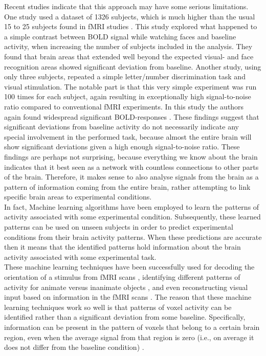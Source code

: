 \documentclass[preprint,journal]{vgtc}
\begin{document}
\indent Recent studies indicate that this approach may have some serious limitations. One study used a dataset of 1326 subjects, which is much higher than the usual 15 to 25 subjects found in fMRI studies \cite{thy:2012very}. This study explored what happened to a simple contrast between BOLD signal while watching faces and baseline activity, when increasing the number of subjects included in the analysis. They found that brain areas that extended well beyond the expected visual- and face recognition areas showed significant deviation from baseline. Another study, using only three subjects, repeated a simple letter/number discrimination task and visual stimulation. The notable part is that this very simple experiment was run 100 times for each subject, again resulting in exceptionally high signal-to-noise ratio compared to conventional fMRI experiments. In this study the authors again found widespread significant BOLD-responses \cite{go:2012whole}. These findings suggest that significant deviations from baseline activity do not necessarily indicate any special involvement in the performed task, because almost the entire brain will show significant deviations given a high enough signal-to-noise ratio. These findings are perhaps not surprising, because everything we know about the brain indicates that it best seen as a network with countless connections to other parts of the brain. Therefore, it makes sense to also analyse signals from the brain as a pattern of information coming from the entire brain, rather attempting to link specific brain areas to experimental conditions.\\
\indent In fact, Machine learning algorithms have been employed to learn the patterns of activity associated with some experimental condition. Subsequently, these learned patterns can be used on unseen subjects in order to predict experimental conditions from their brain activity patterns. When these predictions are accurate then it means that the identified patterns hold information about the brain activity associated with some experimental task.\\
\indent These machine learning techniques have been successfully used for decoding the orientation of a stimulus from fMRI scans \cite{ka:2005decoding}, identifying different patterns of activity for animate versus inanimate objects \cite{kr:2008RSA}, and even reconstructing visual input based on information in the fMRI scans \cite{mi:2008re}. The reason that these machine learning techniques work so well is that patterns of voxel activity can be identified rather than a significant deviation from some baseline. Specifically, information can be present in the pattern of voxels that belong to a certain brain region, even when the average signal from that region is zero (i.e., on average it does not differ from the baseline condition) \cite{to:2012rev}. \\
\end{document}
